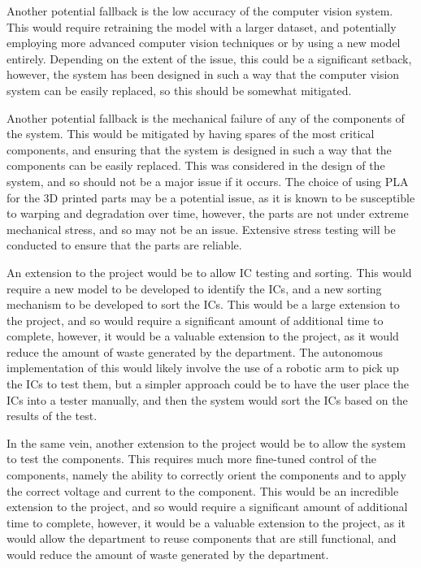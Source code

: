 Another potential fallback is the low accuracy of the computer vision system. This would require retraining the model with a larger dataset, and 
potentially employing more advanced computer vision techniques or by using a new model entirely. Depending on the extent of the issue, this could
be a significant setback, however, the system has been designed in such a way that the computer vision system can be easily replaced, so this should be somewhat mitigated.

Another potential fallback is the mechanical failure of any of the components of the system. This would be mitigated by having spares of the most critical components,
and ensuring that the system is designed in such a way that the components can be easily replaced. This was considered in the design of the system, and so
should not be a major issue if it occurs. The choice of using PLA for the 3D printed parts may be a potential issue, as it is known
to be susceptible to warping and degradation over time, however, the parts are not under extreme mechanical stress, and so may not be an issue. Extensive
stress testing will be conducted to ensure that the parts are reliable.

An extension to the project would be to allow IC testing and sorting. This would require a new model to be developed to identify the ICs, and a new sorting mechanism to be developed to sort the ICs.
This would be a large extension to the project, and so would require a significant amount of additional time to complete, however, it would be a valuable extension to the project, as it would reduce the amount of waste generated by the department.
The autonomous implementation of this would likely involve the use of a robotic arm to pick up the ICs to test them, but a simpler approach could be to have the user place
the ICs into a tester manually, and then the system would sort the ICs based on the results of the test.

In the same vein, another extension to the project would be to allow the system to test the components. This requires much more fine-tuned control of the components, namely
the ability to correctly orient the components and to apply the correct voltage and current to the component.
This would be an incredible extension to the project, and so would require a significant amount of additional time to complete, however, it would be a valuable extension to the project, as it would allow the department to reuse components that are still functional, and would reduce the amount of waste generated by the department.